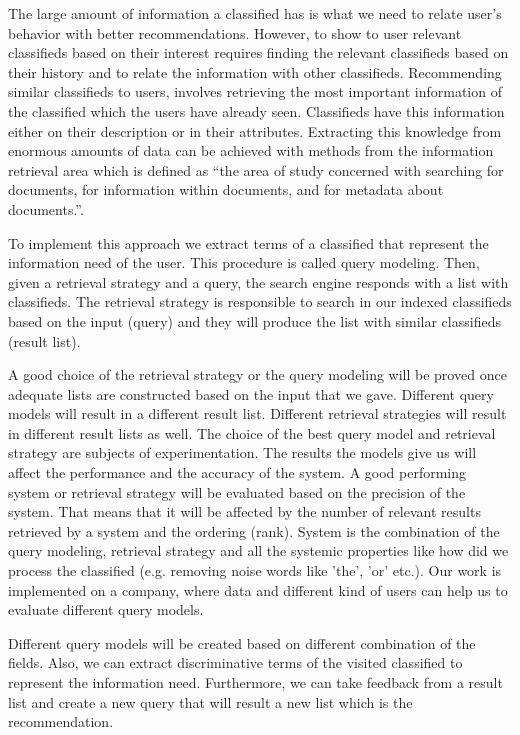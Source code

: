 The large amount of information a classified has is what we need to relate user’s behavior with better recommendations. However, to show to user relevant classifieds based on their interest requires finding the relevant classifieds based on their history and to relate the information with other classifieds. Recommending similar classifieds to users, involves retrieving the most important information of the classified which the users have already seen. Classifieds have this information either on their description or in their attributes. Extracting this knowledge from enormous amounts of data can be achieved with methods from the information retrieval area which is defined as ``the area of study concerned with searching for documents, for information within documents, and for metadata about documents.''\cite{SinghSingh}.

To implement this approach we extract terms of a classified that represent the information need of the user. This procedure is called query modeling. Then, given a retrieval strategy and a query, the search engine responds with a list with classifieds. The retrieval strategy is responsible to search in our indexed classifieds based on the input (query) and they will produce the list with similar classifieds (result list).

A good choice of the retrieval strategy or the query modeling will be proved once adequate lists are constructed based on the input that we gave. Different query models will result in a different result list. Different retrieval strategies will result in different result lists as well. The choice of the best query model and retrieval strategy are subjects of experimentation. The results the models give us will affect the performance and the accuracy of the system. A good performing system or retrieval strategy will be evaluated based on the precision of the system. That means that it will be affected by the number of relevant results retrieved by a system and the ordering (rank). System is the combination of the query modeling, retrieval strategy and all the systemic properties like how did we process the classified (e.g. removing noise words like 'the', 'or' etc.). Our work is implemented on a company, where data and different kind of users can help us to evaluate different query models.

Different query models will be created based on different combination of the fields. Also, we can extract discriminative terms of the visited classified to represent the information need. Furthermore, we can take feedback from a result list and create a new query that will result a new list which is the recommendation.

